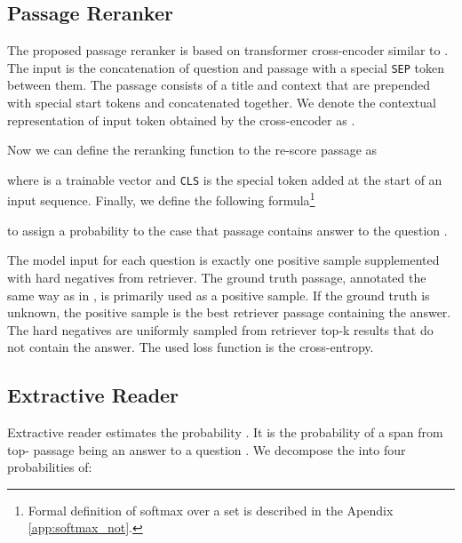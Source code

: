 \documentclass[11pt,a4paper]{article}
\begin{document}
\subsection{Passage Reranker}\label{ss:reranker}








The proposed passage reranker is based on transformer cross-encoder similar to \citet{nogueira2019passage, luan2020sparse}.
The input is the concatenation of question  and passage  with a special \texttt{SEP} token between them. The passage consists of a title and context that are prepended with special start tokens and concatenated together.
We denote the contextual representation of input token  obtained by the cross-encoder as .

Now we can define the reranking function to the re-score passage as

where  is a trainable vector and \texttt{CLS} is the special token added at the start of an input sequence.
Finally, we define the following formula\footnote{Formal definition of softmax over a set is described in the Apendix \ref{app:softmax_not}.}

to assign a probability to the case that passage  contains answer to the question .

\begin{description}[style=unboxed,leftmargin=0em,listparindent=\parindent]
    \setlength\parskip{0em}
\item[Training.] The model input for each question is exactly one positive sample supplemented with hard negatives from retriever. The ground truth passage, annotated the same way as in \citet{karpukhin2020dense}, is primarily used as a positive sample. If the ground truth is unknown, the positive sample is the best retriever passage containing the answer.
The hard negatives are uniformly sampled from retriever top-k results that do not contain the answer. 
The used loss function is the cross-entropy.
\end{description}


\subsection{Extractive Reader}
\label{ss:ext_reader}

Extractive reader estimates the probability . 
It is the probability of a span  from top- passage  being an answer to a question . 
We decompose the  into four probabilities of:
\end{document}
